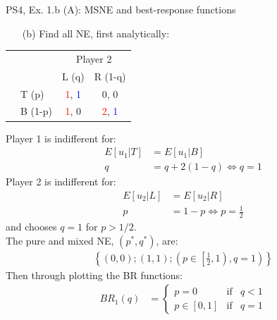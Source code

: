 \begin{frame}{PS4, Ex. 1.b (A): MSNE and best-response functions}
  \begin{multicols}{2}
    \begin{itemize}
      \item[(b)] Find all NE, first analytically:
    \end{itemize}
    \vspace{-8pt}
    \begin{table}
      \begin{tabular}{cl|c|c|}
        & \multicolumn{1}{c}{} & \multicolumn{2}{c}{\color{blue}Player 2}\\
        \parbox[t]{1mm}{}
        &  &  &  \\
        & T (p) & \textcolor{red}{1}, \textcolor{blue}{1} & 0, 0 \\
        & B (1-p) & \textcolor{red}{1}, 0 & \textcolor{red}{2}, \textcolor{blue}{1} \\
      \end{tabular}
    \end{table}
    Player 1 is indifferent for:
    \begin{align*}
      E[u_1|T]&=E[u_1|B]\\
      q &= q + 2(1-q) \Leftrightarrow q = 1
    \end{align*}
    Player 2 is indifferent for:
    \begin{align*}
      E[u_2|L]&=E[u_2|R]\\
      p &= 1-p \Leftrightarrow p = \frac{1}{2}
    \end{align*}
    and chooses $q=1$ for $p>1/2$.\\\medskip
    The pure and mixed NE, $(p^{*},q^{*})$, are:
    \begin{align*}
      \left\{(0,0);(1,1);\left(p\in\left[\frac{1}{2},1\right),q=1\right)\right\}
    \end{align*}
  \vfill\null \columnbreak
    Then through plotting the BR functions:
    \vspace{-8pt}
    \begin{align*}
      BR_1(q)&=\left\{ \begin{array}{lcl}
          p=0       & \text{if} & q<1 \\
          p\in[0,1] & \text{if} & q=1
      \end{array}\right. \\

\end{align*}
\end{multicols}
\end{frame}
